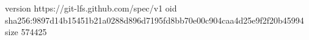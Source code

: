 version https://git-lfs.github.com/spec/v1
oid sha256:9897d14b15451b21a0288d896d7195fd8bb70e00c904caa4d25e9f2f20b45994
size 574425
